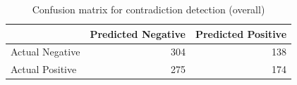 \begin{table}
\caption{Confusion matrix for contradiction detection (overall)}
\label{tab:confusion_matrix}
\begin{tabular}{lrr}
\toprule
 & Predicted Negative & Predicted Positive \\
\midrule
Actual Negative & 304 & 138 \\
Actual Positive & 275 & 174 \\
\bottomrule
\end{tabular}
\end{table}
